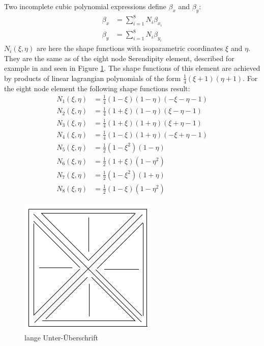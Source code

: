   Two incomplete cubic polynomial expressions define $\beta_x$ and $\beta_y$:
  \begin{align}
  \beta_x &= \sum_{i=1}^{8} N_i \beta_{x_i}\\
  \beta_y &= \sum_{i=1}^{8} N_i \beta_{y_i}
  \end{align}
  $N_i(\xi,\eta)$ are here the shape functions with isoparametric coordinates $\xi$ and $\eta$. They are the same as of the eight node Serendipity element, described for example in \cite{zienkiewicz2000finite} and seen in Figure \ref{fig:platzhalter}. The shape functions of this element are achieved by products of linear lagrangian polynomials of the form $\frac{1}{4}(\xi+1)(\eta+1)$. For the eight node element the following shape functions result:
  \begin{align}
  N_1(\xi, \eta) &= \frac{1}{4}(1-\xi)(1-\eta)(-\xi-\eta-1) \nonumber\\
  N_2(\xi, \eta) &= \frac{1}{4}(1+\xi)(1-\eta)(\xi-\eta-1) \nonumber\\
  N_3(\xi, \eta) &= \frac{1}{4}(1+\xi)(1+\eta)(\xi+\eta-1) \nonumber\\
  N_4(\xi, \eta) &= \frac{1}{4}(1-\xi)(1+\eta)(-\xi+\eta-1) \nonumber\\
  N_5(\xi, \eta) &= \frac{1}{2}(1-\xi^2)(1-\eta) \nonumber\\
  N_6(\xi, \eta) &= \frac{1}{2}(1+\xi)(1-\eta^2) \nonumber\\
  N_7(\xi, \eta) &= \frac{1}{2}(1-\xi^2)(1+\eta) \nonumber\\
  N_8(\xi, \eta) &= \frac{1}{2}(1-\xi)(1-\eta^2) \nonumber
  \end{align}
  \begin{figure} %
  	\centering
  	\includegraphics[width=0.7\linewidth]{figures/platzhalter}
  	\caption[kurze Unter-Überschrift]{lange Unter-Überschrift}
  	\label{fig:platzhalter}
  \end{figure}
